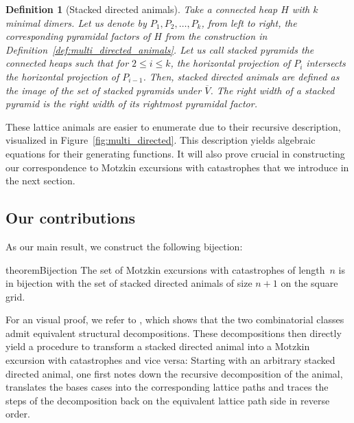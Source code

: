 \documentclass{article}
\newtheorem{definition}[theorem]{Definition}
\theoremstyle{definition}
\begin{document}
\begin{definition}[Stacked directed animals]
\label{def:stacked_directed_animals}
  Take a connected heap $H$ with $k$ minimal dimers. Let us denote by $P_1,P_2,\dots,P_k$, from left to right, the corresponding \emph{pyramidal factors} of $H$ from the construction in Definition~\ref{def:multi_directed_animals}. 
  Let us call \emph{stacked pyramids} the connected heaps such that for $2 \leq i \leq k$, the horizontal projection of $P_i$ intersects the horizontal projection of $P_{i-1}$. 
  Then, \emph{stacked directed animals} are defined as the image of the set of stacked pyramids under $\overline{V}$.
  The \emph{right width} of a stacked pyramid is the right width of its rightmost pyramidal factor. 
\end{definition}

\smallskip

These lattice animals are easier to enumerate due to their recursive description, visualized in Figure~\ref{fig:multi_directed}.
This description yields algebraic equations for their generating functions.
It will also prove crucial in constructing our correspondence to Motzkin excursions with catastrophes that we introduce in the next section.

\subsection{Our contributions}

As our main result, we construct the following bijection:

\begin{restatable}{theorem}{Bijection} 
  \label{thm:bijection}
  The set of Motzkin excursions with catastrophes of length~$n$ is in bijection with the set of stacked directed animals of size $n + 1$ on the square grid.
\end{restatable}

For an visual proof, we refer to , which shows that the two combinatorial classes admit equivalent structural decompositions. 
These decompositions then directly yield a procedure to transform a stacked directed animal into a Motzkin excursion with catastrophes and vice versa:
Starting with an arbitrary stacked directed animal, one first notes down the recursive decomposition of the animal, translates the bases cases into the corresponding lattice paths and traces the steps of the decomposition back on the equivalent lattice path side in reverse order.
\end{document}
